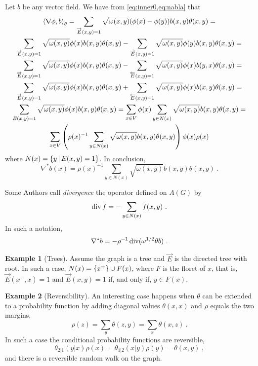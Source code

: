 \documentclass[12pt,a4paper]{amsart}
\theoremstyle{definition}
\newtheorem{example}{Example}
\begin{document}
Let $b$ be any vector field. We have from \cref{eq:inner0,eq:nabla} that
\begin{multline*}
  \left\langle\nabla \phi,b\right\rangle_{\theta} = \sum_{\overrightarrow E(x,y)=1}
  \sqrt{\omega(x,y)}  (\phi(x) - \phi(y)) b(x,y) \theta(x,y) = \\
  \sum_{\overrightarrow E(x,y)=1} \sqrt{\omega(x,y)} \phi(x) b(x,y)
  \theta(x,y) - \sum_{\overrightarrow E(x,y)=1}
  \sqrt{\omega(x,y)}  \phi(y) b(x,y) \theta(x,y) = \\
  \sum_{\overrightarrow E(x,y)=1} \sqrt{\omega(x,y)} \phi(x) b(x,y)
  \theta(x,y) - \sum_{\overleftarrow E(x,y)=1}
  \sqrt{\omega(x,y)}  \phi(x) b(y,x) \theta(x,y) = \\
  \sum_{\overrightarrow E(x,y)=1} \sqrt{\omega(x,y)} \phi(x) b(x,y)
  \theta(x,y) + \sum_{\overleftarrow E(x,y)=1}
  \sqrt{\omega(x,y)}  \phi(x) b(x,y) \theta(x,y) = \\
  \sum_{E(x,y)=1} \sqrt{\omega(x,y)}  \phi(x) b(x,y) \theta(x,y) = 
  \sum_{x \in V} \phi(x) \sum_{y \in N(x)}
  \sqrt{\omega(x,y)}  b(x,y) \theta(x,y) = \\
  \sum_{x \in V} \left(\rho(x)^{-1} \sum_{y \in N(x)}
  \sqrt{\omega(x,y)}  b(x,y) \theta(x,y) \right) \phi(x) \rho(x)
\end{multline*}
where $N(x) = \left\{y \, \middle| \, E(x,y)=1 \right\}$. In conclusion,
\begin{equation*}
  \nabla^* b(x) = \rho(x)^{-1} \sum_{y \in N(x)}
  \sqrt{\omega(x,y)}  b(x,y) \theta(x,y) \ .
\end{equation*}

Some Authors call \emph{divergence} the operator defined on $A(G)$ by
\begin{equation*}
  \Div f = - \sum_{y \in N(x)} f(x,y) \ .
\end{equation*}
In such a notation,
\begin{equation*}
  \nabla^* b = - \rho^{-1} \operatorname*{div}(\omega^{1/2} \theta b) \ . 
\end{equation*}


\begin{example}[Trees] Assume the graph is a tree and $\overrightarrow
E$ is the directed tree with root. In such a case, $N(x) = \left\{x^+\right\}
\cup F(x)$, where $F$ is the floret of $x$, that is, $\overrightarrow E(x^+,x) =
1$ and $\overrightarrow E(x,y)=1$ if, and only if, $y \in F(x)$.
\end{example}

\begin{example}[Reversibility] An interesting case happens when $\theta$
can be extended to a probability function by adding diagonal values
$\theta(x,x)$ and $\rho$ equals the two margins,
\begin{equation*}
  \rho(z) = \sum_y \theta(z,y) = \sum_x \theta(x,z) \ .
\end{equation*}
In such a case the conditional probability functions are reversible,
\begin{equation*}
  \theta_{2|1}(y|x) \rho(x) = \theta_{1|2}(x|y) \rho(y) = \theta(x,y) \ ,
\end{equation*}
and there is a reversible random walk on the graph.
\end{example}
\end{document}
